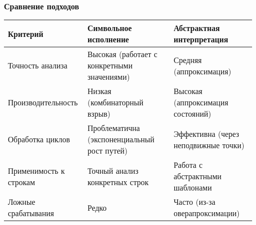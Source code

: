 \subsubsection{Сравнение подходов}
\begin{center}
\begin{tabular}{|p{}|p{}|p{}|}
\hline
\textbf{Критерий} & \textbf{Символьное исполнение} & \textbf{Абстрактная интерпретация} \\
\hline
Точность анализа & Высокая (работает с конкретными значениями) & Средняя (аппроксимация) \\
\hline
Производительность & Низкая (комбинаторный взрыв) & Высокая (аппроксимация состояний) \\
\hline
Обработка циклов & Проблематична (экспоненциальный рост путей) & Эффективна (через неподвижные точки) \\
\hline
Применимость к строкам & Точный анализ конкретных строк & Работа с абстрактными шаблонами \\
\hline
Ложные срабатывания & Редко & Часто (из-за оверапроксимации) \\
\hline
\end{tabular}
\end{center}

\newpage